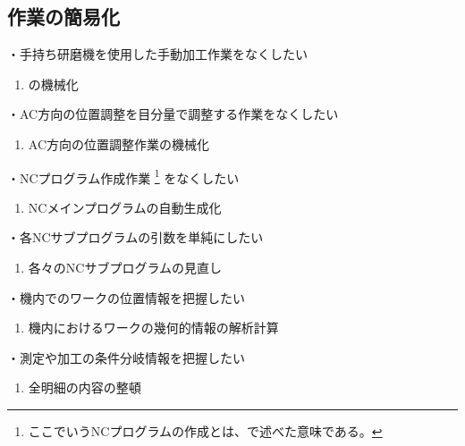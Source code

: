 \subsection{\EndFaceChamferMilling 作業の簡易化}
・手持ち研磨機を使用した手動加工作業をなくしたい
\begin{enumerate}[label=\sarrow]
\item \EndFaceChamferMilling の機械化
\end{enumerate}
・AC方向の位置調整を目分量で調整する作業をなくしたい
\begin{enumerate}[label=\sarrow]
\item AC方向の位置調整作業の機械化
\end{enumerate}



\clearpage
・NCプログラム作成作業%
\footnote{ここでいうNCプログラムの作成とは、で述べた意味である。}
をなくしたい
\begin{enumerate}[label=\sarrow]
\item {}NCメインプログラムの自動生成化
\end{enumerate}
・各NCサブプログラムの引数を単純にしたい
\begin{enumerate}[label=\sarrow]
\item 各々のNCサブプログラムの見直し
\end{enumerate}



・機内でのワークの位置情報を把握したい
\begin{enumerate}[label=\sarrow]
\item 機内におけるワークの幾何的情報の解析計算
\end{enumerate}
・測定や加工の条件分岐情報を把握したい
\begin{enumerate}[label=\sarrow]
\item 全明細の内容の整頓
\end{enumerate}




